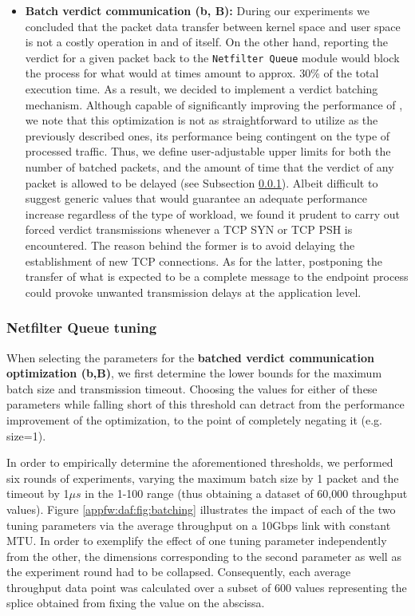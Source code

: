 \begin{itemize}
    \item \textbf{Batch verdict communication (b, B):} During our experiments we concluded that the packet data transfer between kernel space and user space is not a costly operation in and of itself. On the other hand, reporting the verdict for a given packet back to the \texttt{Netfilter Queue} module would block the process for what would at times amount to approx. 30\% of the total execution time. As a result, we decided to implement a verdict batching mechanism. Although capable of significantly improving the performance of \daf{}, we note that this optimization is not as straightforward to utilize as the previously described ones, its performance being contingent on the type of processed traffic. Thus, we define user-adjustable upper limits for both the number of batched packets, and the amount of time that the verdict of any packet is allowed to be delayed (see Subsection \ref{appfw:daf:queuq-verdict-batch-tuning}). Albeit difficult to suggest generic values that would guarantee an adequate performance increase regardless of the type of workload, we found it prudent to carry out forced verdict transmissions whenever a TCP SYN or TCP PSH is encountered. The reason behind the former is to avoid delaying the establishment of new TCP connections. As for the latter, postponing the transfer of what is expected to be a complete message to the endpoint process could provoke unwanted transmission delays at the application level.
\end{itemize}


\subsubsection{Netfilter Queue tuning}
\label{appfw:daf:queuq-verdict-batch-tuning}

When selecting the parameters for the \textbf{batched verdict communication optimization (b,B)}, we first determine the lower bounds for the maximum batch size and transmission timeout. Choosing the values for either of these parameters while falling short of this threshold can detract from the performance improvement of the optimization, to the point of completely negating it (e.g. size=1).



In order to empirically determine the aforementioned thresholds, we performed six rounds of experiments, varying the maximum batch size by 1 packet and the timeout by 1$\mu{}s$ in the 1-100 range (thus obtaining a dataset of 60,000 throughput values). Figure \ref{appfw:daf:fig:batching} illustrates the impact of each of the two tuning parameters via the average throughput on a 10Gbps link with constant MTU. In order to exemplify the effect of one tuning parameter independently from the other, the dimensions corresponding to the second parameter as well as the experiment round had to be collapsed. Consequently, each average throughput data point was calculated over a subset of 600 values representing the splice obtained from fixing the value on the abscissa.


